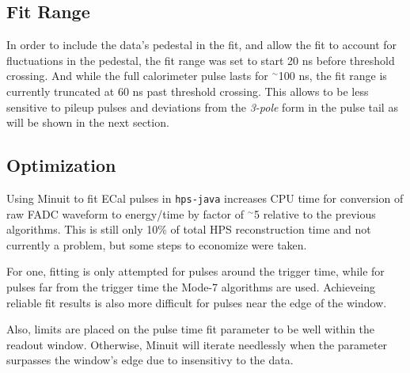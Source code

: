 \documentclass[amsmath,amssymb,notitlepage,12pt]{revtex4-1}
\begin{document}
\subsection{Fit Range}
In order to include the data's pedestal in the fit, and allow the fit to account for fluctuations in the pedestal, the fit range was set to start 20 ns before threshold crossing. 
And while the full calorimeter pulse lasts for $^\sim$100 ns, the fit range is currently truncated at 60 ns past threshold crossing.
This allows to be less sensitive to pileup pulses and deviations from the {\em 3-pole} form in the pulse tail as will be shown in the next section. 

\subsection{Optimization}
Using Minuit to fit ECal pulses in \texttt{hps-java} increases CPU time for conversion of raw FADC waveform to energy/time by factor of $^\sim$5 relative to the previous algorithms.
This is still only 10\% of total HPS reconstruction time and not currently a problem, but some steps to economize were taken. 

For one, fitting is only attempted for pulses around the trigger time, while for pulses far from the trigger time the Mode-7 algorithms are used.  Achieveing reliable fit results is also more difficult for pulses near the edge of the window.

Also, limits are placed on the pulse time fit parameter to be well within the readout window.  Otherwise, Minuit will iterate needlessly when the parameter surpasses the window's edge due to insensitivy to the data.
\end{document}
